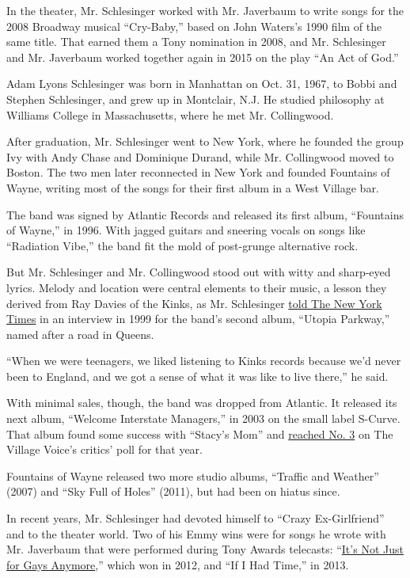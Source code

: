 In the theater, Mr. Schlesinger worked with Mr. Javerbaum to write songs
for the 2008 Broadway musical ``Cry-Baby,'' based on John Waters's 1990
film of the same title. That earned them a Tony nomination in 2008, and
Mr. Schlesinger and Mr. Javerbaum worked together again in 2015 on the
play ``An Act of God.''

Adam Lyons Schlesinger was born in Manhattan on Oct. 31, 1967, to Bobbi
and Stephen Schlesinger, and grew up in Montclair, N.J. He studied
philosophy at Williams College in Massachusetts, where he met Mr.
Collingwood.

After graduation, Mr. Schlesinger went to New York, where he founded the
group Ivy with Andy Chase and Dominique Durand, while Mr. Collingwood
moved to Boston. The two men later reconnected in New York and founded
Fountains of Wayne, writing most of the songs for their first album in a
West Village bar.

The band was signed by Atlantic Records and released its first album,
``Fountains of Wayne,'' in 1996. With jagged guitars and sneering vocals
on songs like ``Radiation Vibe,'' the band fit the mold of post-grunge
alternative rock.

But Mr. Schlesinger and Mr. Collingwood stood out with witty and
sharp-eyed lyrics. Melody and location were central elements to their
music, a lesson they derived from Ray Davies of the Kinks, as Mr.
Schlesinger
\href{https://www.nytimes.com/1999/07/09/movies/streets-new-york-with-fountains-wayne-urban-minstrels-with-roots-suburbia.html}{told
The New York Times} in an interview in 1999 for the band's second album,
``Utopia Parkway,'' named after a road in Queens.

``When we were teenagers, we liked listening to Kinks records because
we'd never been to England, and we got a sense of what it was like to
live there,'' he said.

With minimal sales, though, the band was dropped from Atlantic. It
released its next album, ``Welcome Interstate Managers,'' in 2003 on the
small label S-Curve. That album found some success with ``Stacy's Mom''
and \href{https://www.robertchristgau.com/xg/pnj/pjres03.php}{reached
No. 3} on The Village Voice's critics' poll for that year.

Fountains of Wayne released two more studio albums, ``Traffic and
Weather'' (2007) and ``Sky Full of Holes'' (2011), but had been on
hiatus since.

In recent years, Mr. Schlesinger had devoted himself to ``Crazy
Ex-Girlfriend'' and to the theater world. Two of his Emmy wins were for
songs he wrote with Mr. Javerbaum that were performed during Tony Awards
telecasts: ``\href{https://www.youtube.com/watch?v=3BHyfYiBt5o}{It's Not
Just for Gays Anymore},'' which won in 2012, and ``If I Had Time,'' in
2013.

